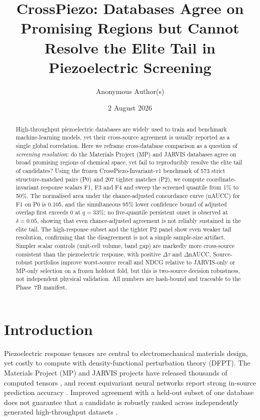 \documentclass[11pt]{article}
\title{\textbf{CrossPiezo: Databases Agree on Promising Regions but Cannot Resolve the Elite Tail in Piezoelectric Screening}}
\author[1]{Anonymous Author(s)}
\affil[1]{Anonymous Institution}
\date{2 August 2026}
\begin{document}
\maketitle

\begin{abstract}
High-throughput piezoelectric databases are widely used to train and benchmark machine-learning models, yet their cross-source agreement is usually reported as a single global correlation.
Here we reframe cross-database comparison as a question of \emph{screening resolution}: do the Materials Project (MP) and JARVIS databases agree on broad promising regions of chemical space, yet fail to reproducibly resolve the elite tail of candidates?
Using the frozen CrossPiezo-Invariant-v1 benchmark of 573 strict structure-matched pairs (P0) and 207 tighter matches (P2), we compute coordinate-invariant response scalars F1, F3 and F4 and sweep the screened quantile from 1\% to 50\%.
The normalised area under the chance-adjusted concordance curve (nAUCC) for F1 on P0 is 0.105, and the simultaneous 95\% lower confidence bound of adjusted overlap first exceeds 0 at $q=33\%$; no five-quantile persistent onset is observed at $\delta=0.05$, showing that even chance-adjusted agreement is not reliably sustained in the elite tail.
The high-response subset and the tighter P2 panel show even weaker tail resolution, confirming that the disagreement is not a simple sample-size artifact.
Simpler scalar controls (unit-cell volume, band gap) are markedly more cross-source consistent than the piezoelectric response, with positive $\Delta\tau$ and $\Delta$nAUCC.
Source-robust portfolios improve worst-source recall and NDCG relative to JARVIS-only or MP-only selection on a frozen holdout fold, but this is two-source decision robustness, not independent physical validation.
All numbers are hash-bound and traceable to the Phase~7B manifest.
\end{abstract}

\section{Introduction}
Piezoelectric response tensors are central to electromechanical materials design, yet costly to compute with density-functional perturbation theory (DFPT).
The Materials Project (MP) and JARVIS projects have released thousands of computed tensors \cite{dejong2015,choudhary2020}, and recent equivariant neural networks report strong in-source prediction accuracy \cite{yan2024,dong2025,batzner2022}.
Improved agreement with a held-out subset of one database does not guarantee that a candidate is robustly ranked across independently generated high-throughput datasets \cite{hegde2023,wagner2023}.
\end{document}

